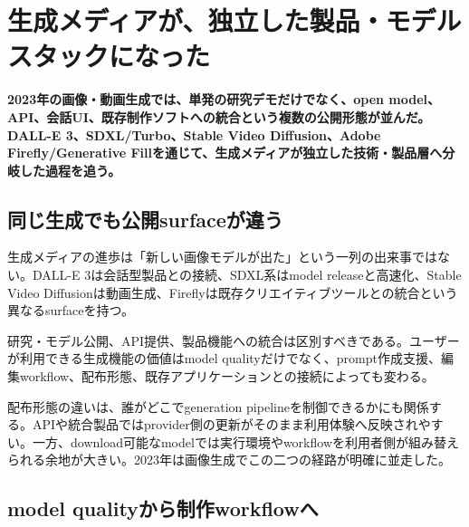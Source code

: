 \section{生成メディアが、独立した製品・モデルスタックになった}
\label{pkg:generative-media}
\noindent\textbf{2023年の画像・動画生成では、単発の研究デモだけでなく、open model、API、会話UI、既存制作ソフトへの統合という複数の公開形態が並んだ。DALL-E 3、SDXL/Turbo、Stable Video Diffusion、Adobe Firefly/Generative Fillを通じて、生成メディアが独立した技術・製品層へ分岐した過程を追う。}\autocite{src-091bbe9dbf4e,src-096341c0ccf6,src-0b410c70bfc7,src-18f22707bf78,src-2b694ab9a461,src-2c97fc5583a3,src-317afaba6510,src-9bc8e7751f80,src-9da0d929aa45,src-a4f61fbe35c5,src-ba80e5e27a11,src-e79065444906}

\subsection{同じ生成でも公開surfaceが違う}

生成メディアの進歩は「新しい画像モデルが出た」という一列の出来事ではない。DALL-E 3は会話型製品との接続、SDXL系はmodel releaseと高速化、Stable Video Diffusionは動画生成、Fireflyは既存クリエイティブツールとの統合という異なるsurfaceを持つ。\autocite{src-091bbe9dbf4e,src-096341c0ccf6,src-0b410c70bfc7,src-18f22707bf78,src-2b694ab9a461,src-2c97fc5583a3,src-317afaba6510,src-9bc8e7751f80,src-9da0d929aa45,src-a4f61fbe35c5,src-ba80e5e27a11,src-e79065444906}


研究・モデル公開、API提供、製品機能への統合は区別すべきである。ユーザーが利用できる生成機能の価値はmodel qualityだけでなく、prompt作成支援、編集workflow、配布形態、既存アプリケーションとの接続によっても変わる。\autocite{src-091bbe9dbf4e,src-18f22707bf78,src-2b694ab9a461,src-317afaba6510,src-9bc8e7751f80,src-9da0d929aa45,src-a4f61fbe35c5,src-ba80e5e27a11,src-e79065444906}


配布形態の違いは、誰がどこでgeneration pipelineを制御できるかにも関係する。APIや統合製品ではprovider側の更新がそのまま利用体験へ反映されやすい。一方、download可能なmodelでは実行環境やworkflowを利用者側が組み替えられる余地が大きい。2023年は画像生成でこの二つの経路が明確に並走した。\autocite{src-091bbe9dbf4e,src-18f22707bf78,src-2b694ab9a461,src-317afaba6510,src-9bc8e7751f80,src-9da0d929aa45,src-a4f61fbe35c5,src-ba80e5e27a11,src-e79065444906}


\subsection{model qualityから制作workflowへ}

